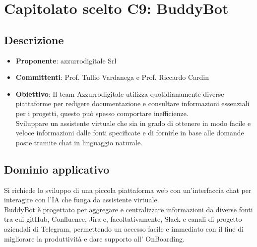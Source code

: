 \documentclass[italian, 12pt]{article}
\begin{document}
\newpage
\tableofcontents
\newpage

\section{Capitolato scelto C9: BuddyBot}
\subsection{Descrizione}
\begin{itemize}
\item\textbf{Proponente}: azzurrodigitale Srl
\item\textbf{Committenti}: Prof. Tullio Vardanega e Prof. Riccardo Cardin
\item\textbf{Obiettivo}:  Il team Azzurrodigitale utilizza quotidianamente diverse piattaforme per redigere documentazione e consultare informazioni essenziali per i progetti, questo può spesso comportare inefficienze.\\
Sviluppare un assistente virtuale che sia in grado di ottenere in modo facile e veloce informazioni dalle fonti specificate e di fornirle in base alle domande poste tramite chat in linguaggio naturale.
\end{itemize}

\subsection{Dominio applicativo}
Si richiede lo sviluppo di una piccola piattaforma web con un'interfaccia chat per interagire con l’IA che funga da assistente virtuale.\\
BuddyBot è progettato per aggregare e centralizzare informazioni da diverse fonti tra cui gitHub, Confluence, Jira e, facoltativamente, Slack e canali di progetto aziendali di Telegram, permettendo un accesso facile e immediato con il fine di migliorare la produttività e dare supporto all’ OnBoarding.
\end{document}
